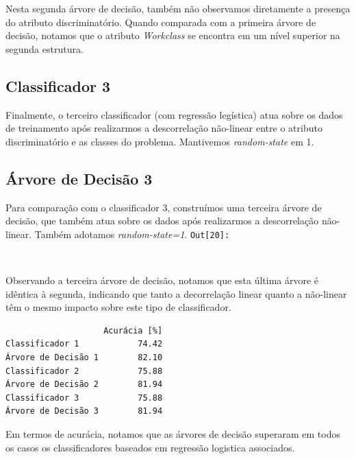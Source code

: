 \documentclass[11pt]{article}
\begin{document}
    Nesta segunda árvore de decisão, também não observamos diretamente a
presença do atributo discriminatório. Quando comparada com a primeira
árvore de decisão, notamos que o atributo \emph{Workclass} se encontra
em um nível superior na segunda estrutura.

    \subsection{Classificador 3}\label{classificador-3}

Finalmente, o terceiro classificador (com regressão legística) atua
sobre os dados de treinamento após realizarmos a descorrelação
não-linear entre o atributo discriminatório e as classes do problema.
Mantivemos \emph{random-state} em 1.

    \subsection{Árvore de Decisão 3}\label{uxe1rvore-de-decisuxe3o-3}

Para comparação com o classificador 3, construímos uma terceira árvore
de decisão, que também atua sobre os dados após realizarmos a
descorrelação não-linear. Também adotamos \emph{random-state=1}.
\texttt{\color{outcolor}Out[{\color{outcolor}20}]:}
    
    \begin{center}
    \end{center}
    { \hspace*{\fill} \\}
    

    Observando a terceira árvore de decisão, notamos que esta última árvore
é idêntica à segunda, indicando que tanto a decorrelação linear quanto a
não-linear têm o mesmo impacto sobre este tipo de classificador.

    
    \begin{verbatim}
                    Acurácia [%]
Classificador 1            74.42
Árvore de Decisão 1        82.10
Classificador 2            75.88
Árvore de Decisão 2        81.94
Classificador 3            75.88
Árvore de Decisão 3        81.94
    \end{verbatim}

    
    Em termos de acurácia, notamos que as árvores de decisão superaram em
todos os casos os classificadores baseados em regressão logistica
associados.
\end{document}
